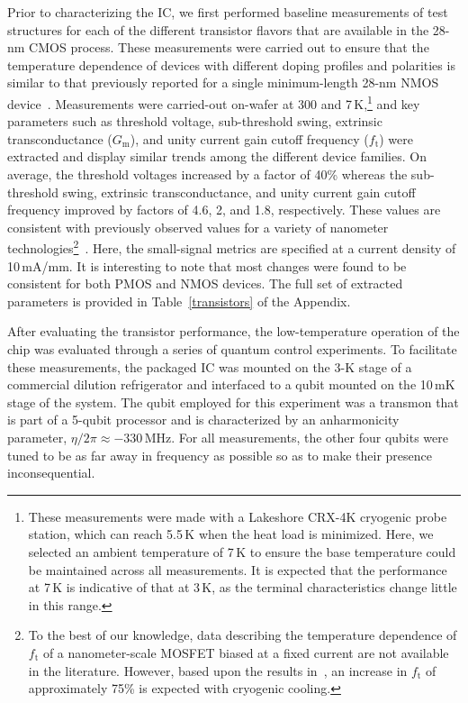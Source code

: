 \documentclass[journal]{IEEEtran}
\newcommand{\CR}[1]{{\color{black}#1}}
\begin{document}
Prior to characterizing the IC, we first performed baseline measurements of test structures for each of the different transistor flavors that are available in the 28-nm CMOS process. These measurements were carried out to ensure that the temperature dependence of devices with different doping profiles and polarities is similar to that previously reported for a single minimum-length 28-nm NMOS device~\cite{beckers2018characterization}. Measurements were carried-out on\CR{-}wafer at 300 and 7\,K,\footnote{\CR{These measurements were made with a Lakeshore CRX-4K cryogenic probe station, which can reach 5.5\,K when the heat load is minimized. Here, we selected an ambient temperature of 7\,K to ensure the base temperature could be maintained across all measurements. It is expected that the performance at 7\,K is indicative of that at 3\,K, as the terminal characteristics change little in this range.}} and key parameters such as threshold voltage, sub-threshold \CR{swing}, extrinsic transconductance ($G_\text{m}$), and unity current gain cutoff frequency ($f_\text{t}$) were extracted and display similar trends among the different device families. On average, the threshold voltages increased by a factor of 40\% whereas the sub-threshold \CR{swing}, extrinsic transconductance, and unity current gain cutoff frequency improved by factors of 4.6, 2, and 1.8, respectively. \CR{These values are consistent with previously observed values for a variety of nanometer technologies\footnote{\CR{To the best of our knowledge, data describing the temperature dependence of $f_\text{t}$ of a nanometer-scale MOSFET biased at a fixed current are not available in the literature. However, based upon the results in~\cite{coskun2014cryogenic}, an increase in $f_\text{t}$ of approximately 75\% is expected with cryogenic cooling.}}~\cite{beckers2018characterization,IEDM_CHARBON,beckers_GM,coskun2014cryogenic}}. Here, the small-signal metrics are specified at a current density of 10\,mA/mm. It is interesting to note that \CR{most} changes \CR{were found to be} consistent for both PMOS and NMOS devices. The full set of extracted parameters is provided in Table~\ref{transistors} of the Appendix. 

After evaluating the transistor performance, the low-temperature operation of the chip was evaluated through a series of quantum control experiments. To facilitate these measurements, the packaged IC was mounted on the 3-K stage of a commercial dilution refrigerator and interfaced to a qubit mounted on the 10\,mK stage of the system. The qubit employed for this experiment was a transmon that is part of a 5-qubit processor and is characterized by an anharmonicity parameter, $\eta/2\pi\approx-330\,$MHz. For all measurements, the other four qubits were tuned to be as far away in frequency as possible so as to make their presence inconsequential.
\end{document}
